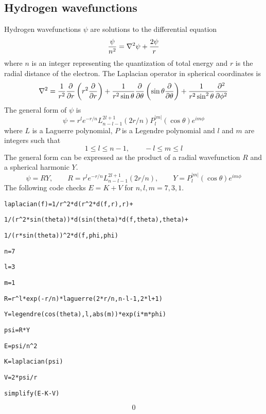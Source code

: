 \subsection{Hydrogen wavefunctions}
Hydrogen wavefunctions $\psi$ are solutions to the differential equation
$${\psi\over n^2}=\nabla^2\psi+{2\psi\over r}$$
where $n$ is an integer representing the quantization of total energy and
$r$ is the radial distance of the electron.
The Laplacian operator in spherical coordinates is
$$\nabla^2={1\over r^2}{\partial\over\partial r}
\left(r^2{\partial\over\partial r}\right)
+{1\over r^2\sin\theta}{\partial\over\partial\theta}
\left(\sin\theta{\partial\over\partial\theta}\right)
+{1\over r^2\sin^2\theta}{\partial^2\over\partial\phi^2}$$
The general form of $\psi$ is
$$\psi=r^le^{-r/n}L_{n-l-1}^{2l+1}(2r/n)
P_l^{|m|}(\cos\theta)e^{im\phi}$$
where $L$ is a Laguerre polynomial, $P$ is a Legendre polynomial and
$l$ and $m$ are integers such that
$$1\le l\le n-1,\qquad -l\le m\le l$$
The general form can be expressed as the product of a radial
wavefunction $R$ and a spherical harmonic $Y$.
$$\psi=RY,\qquad R=r^le^{-r/n}L_{n-l-1}^{2l+1}(2r/n),\qquad
Y=P_l^{|m|}(\cos\theta)e^{im\phi}$$
The following code checks $E=K+V$ for $n,l,m=7,3,1$.

\medskip
\verb$laplacian(f)=1/r^2*d(r^2*d(f,r),r)+$

\verb$1/(r^2*sin(theta))*d(sin(theta)*d(f,theta),theta)+$

\verb$1/(r*sin(theta))^2*d(f,phi,phi)$

\verb$n=7$

\verb$l=3$

\verb$m=1$

\verb$R=r^l*exp(-r/n)*laguerre(2*r/n,n-l-1,2*l+1)$

\verb$Y=legendre(cos(theta),l,abs(m))*exp(i*m*phi)$

\verb$psi=R*Y$

\verb$E=psi/n^2$

\verb$K=laplacian(psi)$

\verb$V=2*psi/r$

\verb$simplify(E-K-V)$

$$0$$

